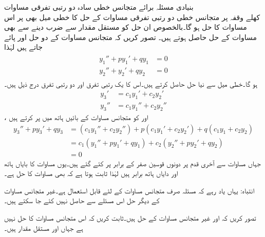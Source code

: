 \quad بنیادی مسئلہ برائے متجانس خطی سادہ دو رتبی تفرقی مساوات\\
کھلے وقفہ  پر متجانس خطی دو رتبی تفرقی مساوات  کے حل کا خطی میل بھی  پر اس مساوات کا حل ہو گا۔بالخصوص ان حل کو مستقل مقدار سے ضرب دینے سے بھی مساوات کے حل حاصل ہوتے ہیں۔
 تصور کریں کہ متجانس مساوات  کے دو حل  اور  پائے جاتے ہیں لہٰذا
\begin{gather}
\begin{aligned}\label{مساوات_درجہ_دو_خطی_میل}
y_1''+py_1'+qy_1&=0\\
y_2''+y_2'+qy_2&=0
\end{aligned}
\end{gather}
ہو گا۔خطی میل سے نیا حل  حاصل کرتے ہیں۔اس کا یک رتبی تفرق اور دو رتبی تفرق درج ذیل ہیں۔
\begin{align*}
y_3' &=c_1y_1'+c_2y_2'\\
y_3'' &=c_1 y_1''+c_2y_2''
\end{align*}
،  اور  کو متجانس مساوات کے بائیں ہاتھ میں پر کرتے ہیں
\begin{align*}
y_3''+py_3'+qy_3&=(c_1 y_1''+c_2y_2'')+p(c_1y_1'+c_2y_2')+q(c_1 y_1+c_2 y_2)\\
&=c_1(y_1''+py_1'+qy_1)+c_2(y_2''+py_2'+qy_2)\\
&=0
\end{align*}
جہاں مساوات  سے آخری قدم پر دونوں قوسین صفر کے برابر پر کئے گئے ہیں۔یوں مساوات کا بایاں ہاتھ اور دایاں ہاتھ برابر ہیں لہٰذا ثابت ہوتا ہے کہ  بھی مساوات    کا حل ہے۔

انتباہ: یہاں یاد رہے کہ مسئلہ  صرف متجانس مساوات کے لئے قابل استعمال ہے۔غیر متجانس مساوات کے دیگر حل اس مسئلے سے حاصل نہیں کئے جا سکتے ہیں۔

تصور کریں کہ  اور  غیر متجانس مساوات  کے حل ہیں۔ثابت کریں کہ  اس متجانس مساوات کا حل نہیں ہے جہاں  اور  مستقل مقدار ہیں۔

